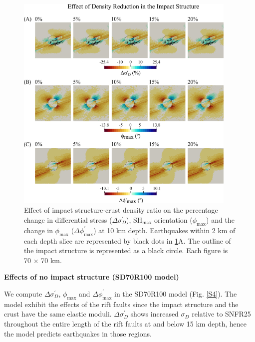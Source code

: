 \documentclass[draft,jgrga]{agutexSI2019}
\begin{document}
\begin{article}
\begin{figure}[ht]
\includegraphics[width=25pc]{Figures/effect_of_density.png}
\caption{Effect of impact structure-crust density ratio on the percentage change in differential stress ($\Delta\sigma_{D}^{\prime}$), SH$_{\max}$ orientation ($\phi_{\max}$) and the change in $\phi_{\max}$ ($\Delta \phi_{\max}^{\prime}$) at 10 km depth. Earthquakes within 2 km of each depth slice are represented by black dots in \ref{S3}A. The outline of the impact structure is represented as a black circle. Each figure is 70 $\times$ 70 km.}
\label{S3}
\end{figure}

\vspace{10mm} %

\noindent\textbf{Effects of no impact structure (SD70R100 model)}

We compute $\Delta \sigma_{D}^{\prime}$, $\phi_{\max}$ and $\Delta \phi_{\max}^{\prime}$ in the SD70R100 model (Fig. \ref{S4}). The model exhibit the effects of the rift faults since the impact structure and the crust have the same elastic moduli. $\Delta\sigma_{D}^{\prime}$ shows increased $\sigma_{D}$ relative to SNFR25 throughout the entire length of the rift faults at and below 15 km depth, hence the model predicts earthquakes in those regions. 


\end{article}
\end{document}
